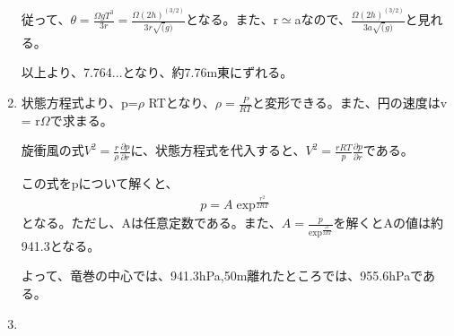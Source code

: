 \documentclass{jsarticle}
\newenvironment{problems}
{
  \renewcommand\labelenumi{\doublebox{\arabic{enumi}}}
  \begin{enumerate}
}{
  \end{enumerate}
  \renewcommand\labelenumi{\arabic{enumi}.}
}
\begin{document}
\begin{problems}
\begin{enumerate}[(1)]
        従って、$\theta = \frac{\Omega g T^3}{3r} = \frac{\Omega(2h)^(3/2)}{3r\sqrt(g)}$となる。また、r$\simeq$aなので、$\frac{\Omega(2h)^(3/2)}{3a\sqrt(g)}$と見れる。

        以上より、7.764...となり、約7.76m東にずれる。
        \item
状態方程式より、p=$\rho$ RTとなり、$\rho = \frac{P}{RT}$と変形できる。また、円の速度はv = r$\Omega$で求まる。

旋衝風の式$V^2 = \frac{r}{\rho}\frac{\partial p}{\partial r}$に、状態方程式を代入すると、$V^2 = \frac{rRT}{p}\frac{\partial p}{\partial r}$である。

この式をpについて解くと、
\begin{eqnarray}
p = A\exp^{\frac{r^2}{2RT}}
\end{eqnarray}
となる。ただし、Aは任意定数である。また、$A = \frac{p}{\exp^{\frac{r^2}{2RT}}}$を解くとAの値は約941.3となる。

よって、竜巻の中心では、941.3hPa,50m離れたところでは、955.6hPaである。

        \item
    \end{enumerate}
\end{problems}
\end{document}
